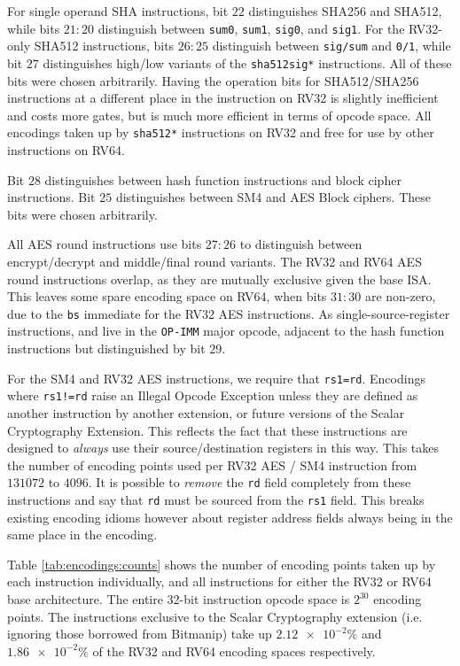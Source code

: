 For single operand SHA instructions,
bit $22$ distinguishes SHA256 and SHA512, while
bits $21:20$ distinguish between
{\tt sum0},
{\tt sum1},
{\tt sig0},
and
{\tt sig1}.
For the RV32-only SHA512 instructions,
bits $26:25$ distinguish between {\tt sig/sum} and {\tt 0/1},
while bit $27$ distinguishes high/low variants of the {\tt sha512sig*}
instructions.
All of these bits were chosen arbitrarily.
Having the operation bits for SHA512/SHA256 instructions at a different place
in the instruction on RV32 is slightly inefficient and costs more gates,
but is much more efficient in terms of opcode space.
All encodings taken up by {\tt sha512*} instructions on RV32 and
free for use by other instructions on RV64.

Bit $28$ distinguishes between hash function instructions and block
cipher instructions.
Bit $25$ distinguishes between SM4 and AES Block ciphers.
These bits were chosen arbitrarily.

All AES round instructions use bits $27:26$ to distinguish between
encrypt/decrypt and middle/final round variants.
The RV32 and RV64 AES round instructions overlap, as they are mutually
exclusive given the base ISA.
This leaves some spare encoding space on RV64, when bits $31:30$
are non-zero, due to the {\tt bs} immediate for the RV32 AES instructions.
As single-source-register instructions,
 and 
live in the {\tt OP-IMM} major opcode, adjacent to the hash function
instructions but distinguished by bit $29$.

For the SM4 and RV32 AES instructions, we require that {\tt rs1=rd}.
Encodings where {\tt rs1!=rd} raise an Illegal Opcode Exception unless
they are defined as another instruction by another extension, or
future versions of the Scalar Cryptography Extension.
This reflects the fact that these instructions are designed to {\em always}
use their source/destination registers in this way.
This takes the number of encoding points used per RV32 AES / SM4 instruction
from $131072$ to $4096$.
It is possible to {\em remove} the {\tt rd} field completely from these
instructions and say that {\tt rd} must be sourced from the {\tt rs1}
field.
This breaks existing encoding idioms however about register address fields
always being in the same place in the encoding.


Table \ref{tab:encodings:counts} shows the number of encoding points
taken up by each instruction individually, and all instructions for either
the RV32 or RV64 base architecture.
The entire 32-bit instruction opcode space is $2^{30}$ encoding points.
The instructions exclusive to the Scalar Cryptography extension
(i.e. ignoring those borrowed from Bitmanip)
take up $\num{2.12e-2}\%$
and     $\num{1.86e-2}\%$
of the RV32 and RV64 encoding spaces respectively.

